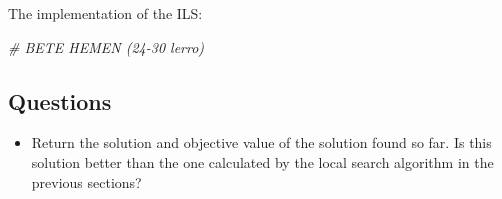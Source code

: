 \documentclass[
]{article}
\newenvironment{Shaded}{\begin{snugshade}}{\end{snugshade}}
\newcommand{\CommentTok}[1]{\textcolor[rgb]{0.56,0.35,0.01}{\textit{#1}}}
\providecommand{\tightlist}{%
  \setlength{\itemsep}{0pt}\setlength{\parskip}{0pt}}
\begin{document}
The implementation of the ILS:

\begin{Shaded}
\begin{Highlighting}[]
\CommentTok{\# BETE HEMEN (24{-}30 lerro)}
\end{Highlighting}
\end{Shaded}

\hypertarget{questions-3}{%
\subsection{Questions}\label{questions-3}}

\begin{itemize}
\tightlist
\item
  Return the solution and objective value of the solution found so far.
  Is this solution better than the one calculated by the local search
  algorithm in the previous sections?
\end{itemize}
\end{document}
